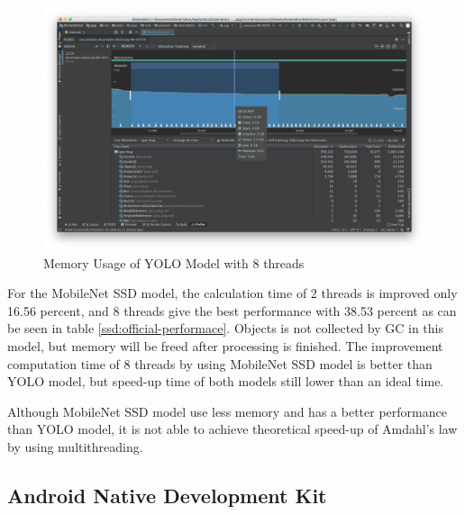             \begin{figure}[!ht]
                \includegraphics[width=6in]{images/chapter5/gc-problem/gc-collecting.png}
                \caption{Memory Usage of YOLO Model with 8 threads}
                \label{yolo:memoryUsage}
            \end{figure}

            For the MobileNet SSD model,
            the calculation time of 2 threads is improved only 16.56 percent,
            and 8 threads give the best performance with 38.53 percent as can be seen in table \ref{ssd:official-performace}.
            Objects is not collected by GC in this model, but memory will be freed after processing is finished.
            The improvement computation time of 8 threads by using MobileNet SSD model is better than YOLO model,
            but speed-up time of both models still lower than an ideal time.

            Although MobileNet SSD model use less memory and has a better performance than YOLO model,
            it is not able to achieve theoretical speed-up of Amdahl's law by using multithreading.

        \subsection{Android Native Development Kit}

